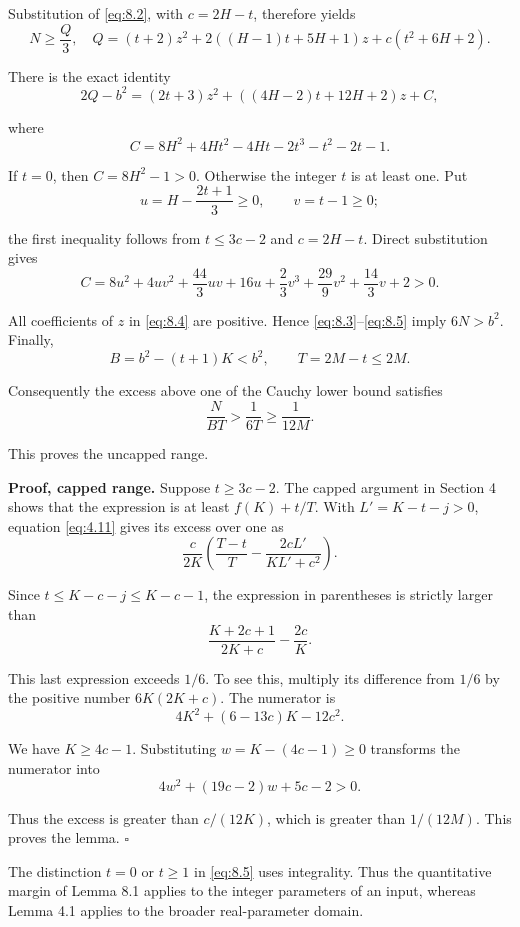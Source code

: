 \documentclass[11pt,a4paper]{article}
\begin{document}
Substitution of \eqref{eq:8.2}, with \(c=2H-t\), therefore yields
\begin{equation}
N\ge\frac Q3,
\quad
Q=(t+2)z^2+2((H-1)t+5H+1)z+c(t^2+6H+2).
\tag{8.3}
\label{eq:8.3}
\end{equation}

There is the exact identity
\begin{equation}
2Q-b^2=(2t+3)z^2+((4H-2)t+12H+2)z+C,
\tag{8.4}
\label{eq:8.4}
\end{equation}

where
\[
C=8H^2+4Ht^2-4Ht-2t^3-t^2-2t-1.
\]

If \(t=0\), then \(C=8H^2-1>0\). Otherwise the integer \(t\) is at least one. Put
\[
u=H-\frac{2t+1}{3}\ge0,\qquad v=t-1\ge0;
\]

the first inequality follows from \(t\le3c-2\) and \(c=2H-t\). Direct substitution gives
\begin{equation}
C=8u^2+4uv^2+\frac{44}{3}uv+16u
 +\frac23v^3+\frac{29}{9}v^2+\frac{14}{3}v+2>0.
\tag{8.5}
\label{eq:8.5}
\end{equation}

All coefficients of \(z\) in \eqref{eq:8.4} are positive. Hence \eqref{eq:8.3}--\eqref{eq:8.5} imply \(6N>b^2\). Finally,
\[
B=b^2-(t+1)K<b^2,\qquad T=2M-t\le2M.
\]

Consequently the excess above one of the Cauchy lower bound satisfies
\[
\frac{N}{BT}>\frac1{6T}\ge\frac1{12M}.
\]

This proves the uncapped range.

\textbf{Proof, capped range.} Suppose \(t\ge3c-2\). The capped argument in Section 4 shows that the expression is at least \(f(K)+t/T\). With \(L'=K-t-j>0\), equation \eqref{eq:4.11} gives its excess over one as
\[
\frac{c}{2K}
\left(\frac{T-t}{T}-\frac{2cL'}{KL'+c^2}\right).
\]

Since \(t\le K-c-j\le K-c-1\), the expression in parentheses is strictly larger than
\[
\frac{K+2c+1}{2K+c}-\frac{2c}{K}.
\]

This last expression exceeds \(1/6\). To see this, multiply its difference from \(1/6\) by the positive number \(6K(2K+c)\). The numerator is
\[
4K^2+(6-13c)K-12c^2.
\]

We have \(K\ge4c-1\). Substituting \(w=K-(4c-1)\ge0\) transforms the numerator into
\[
4w^2+(19c-2)w+5c-2>0.
\]

Thus the excess is greater than \(c/(12K)\), which is greater than \(1/(12M)\). This proves the lemma. \(\square\)

The distinction \(t=0\) or \(t\ge1\) in \eqref{eq:8.5} uses integrality. Thus the quantitative margin of Lemma 8.1 applies to the integer parameters of an input, whereas Lemma 4.1 applies to the broader real-parameter domain.
\end{document}
